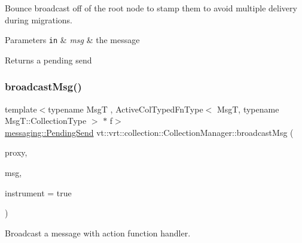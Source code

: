 Bounce broadcast off of the root node to stamp them to avoid multiple delivery during migrations. 


\begin{DoxyParams}[1]{Parameters}
\mbox{\tt in}  & {\em msg} & the message\\
\hline
\end{DoxyParams}
\begin{DoxyReturn}{Returns}
a pending send 
\end{DoxyReturn}
\mbox{\label{structvt_1_1vrt_1_1collection_1_1_collection_manager_a9cadcebd1d7c26512091f9624a23a02c}} 
\subsubsection{\texorpdfstring{broadcast\+Msg()}{broadcastMsg()}\hspace{0.1cm}{\footnotesize\ttfamily [1/6]}}
{\footnotesize\ttfamily template$<$typename MsgT , Active\+Col\+Typed\+Fn\+Type$<$ Msg\+T, typename Msg\+T\+::\+Collection\+Type $>$ $\ast$ f$>$ \\
\hyperlink{structvt_1_1messaging_1_1_pending_send}{messaging\+::\+Pending\+Send} vt\+::vrt\+::collection\+::\+Collection\+Manager\+::broadcast\+Msg (\begin{DoxyParamCaption}\item[{\hyperlink{structvt_1_1vrt_1_1collection_1_1_collection_manager_a56458ed7f9bb22b631b9b3a745f42f94}{Collection\+Proxy\+Wrap\+Type}$<$ typename Msg\+T\+::\+Collection\+Type $>$ const \&}]{proxy,  }\item[{MsgT $\ast$}]{msg,  }\item[{bool}]{instrument = {\ttfamily true} }\end{DoxyParamCaption})}



Broadcast a message with action function handler. 


